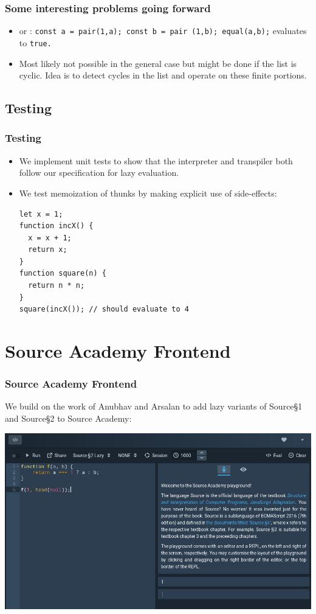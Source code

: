 \documentclass[12pt]{beamer}
\begin{document}
\begin{frame}
\frametitle{Some interesting problems going forward}
\begin{itemize}
    \item<1-> or : \break
    \texttt{const a = pair(1,a); \break const b = pair (1,b); \break equal(a,b);} evaluates to \texttt{true.}
    \item<2-> Most likely not possible in the general case but might be done if the list is cyclic. Idea is to detect cycles in the list and operate on these finite portions. 
\end{itemize}
\end{frame}




\subsection{Testing}

\begin{frame}[fragile]
\frametitle{Testing}
\begin{itemize}
\item<1-> We implement unit tests to show that the interpreter and transpiler both follow our specification for lazy evaluation.
\item<2-> We test memoization of thunks by making explicit use of side-effects:
\begin{lstlisting}
let x = 1;
function incX() {
  x = x + 1;
  return x;
}
function square(n) {
  return n * n;
}
square(incX()); // should evaluate to 4
\end{lstlisting}
\end{itemize}
\end{frame}

\section{Source Academy Frontend}

\begin{frame}
\frametitle{Source Academy Frontend}
We build on the work of Anubhav and Arsalan to add lazy variants of Source\S1 and Source\S2 to Source Academy:
\begin{center}
\includegraphics[width=0.7\linewidth]{safrontend}
\end{center}
\end{frame}
\end{document}
